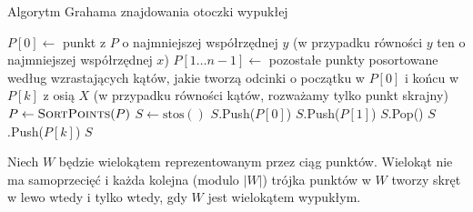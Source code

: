 \begin{algorithm}[H]
	\caption{Algorytm Grahama znajdowania otoczki wypukłej}\label{alg:graham}
	\begin{algorithmic}[1]
			\State $P[0] \gets $ punkt z $P$ o najmniejszej współrzędnej $y$ (w przypadku równości $y$ ten o najmniejszej współrzędnej $x$)
			\State $P[1 \dots n-1] \gets $ pozostałe punkty posortowane według wzrastających kątów, jakie tworzą odcinki o początku w $P[0]$ i końcu w $P[k]$ z osią $X$ (w przypadku równości kątów, rozważamy tylko punkt skrajny)
		\EndProcedure
			\State $P \gets \textsc{SortPoints}(P)$
			\State $S \gets \text{stos}()$
			\State $S$.Push($P[0]$)
			\State $S$.Push($P[1]$)
					\State $S$.Pop()
				\EndWhile
				\State $S$.Push($P[k]$)
			\EndFor
			\State \Return $S$
		\EndProcedure
	\end{algorithmic}
\end{algorithm}

\begin{fact}
	\label{fact:wielwypukly}
	Niech $W$ będzie wielokątem reprezentowanym przez ciąg punktów. Wielokąt nie ma samoprzecięć i każda kolejna (modulo $|W|$) trójka punktów w $W$\! tworzy skręt w lewo wtedy i tylko wtedy, gdy $W$ jest wielokątem wypukłym.
\end{fact}

